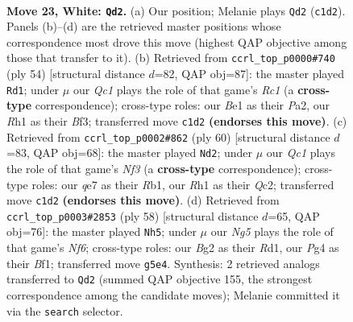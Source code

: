 \documentclass[11pt]{article}
\begin{document}
\clearpage

\begin{figure}[p]\centering
\begin{subfigure}{0.46\textwidth}\centering
\resizebox{\linewidth}{!}{%
\newchessgame
\chessboard[
  setfen={2b1k2r/4qp2/8/2pp2N1/3n2Pp/1p6/1P2PPB1/K1Q1B2R w k - 0 23},
  showmover=false,
  pgfstyle=straightmove, color=movearrow, markmove={c1-d2}
]}
\caption{}
\end{subfigure}\hfill
\begin{subfigure}{0.46\textwidth}\centering
\resizebox{\linewidth}{!}{%
\newchessgame
\chessboard[
  setfen={4r1k1/ppq2pp1/5n1p/2P1Nb2/3Q1P2/5B1P/P5P1/2R3K1 w - - 5 28},
  showmover=false,
  pgfstyle=straightmove, color=movearrow, markmove={c1-d1}
]}
\caption{}
\end{subfigure}
\\[4pt]
\begin{subfigure}{0.46\textwidth}\centering
\resizebox{\linewidth}{!}{%
\newchessgame
\chessboard[
  setfen={1q1r2k1/4bp2/1n4pp/p1n5/P1p5/B4NPP/2Q2PB1/1R4K1 w - - 0 31},
  showmover=false,
  pgfstyle=straightmove, color=movearrow, markmove={f3-d2}
]}
\caption{}
\end{subfigure}\hfill
\begin{subfigure}{0.46\textwidth}\centering
\resizebox{\linewidth}{!}{%
\newchessgame
\chessboard[
  setfen={2r4k/2n2ppp/4pN1q/8/Pp2P1Q1/1n4P1/1B3b1P/3R1B1K w - - 8 30},
  showmover=false,
  pgfstyle=straightmove, color=movearrow, markmove={f6-h5}
]}
\caption{}
\end{subfigure}
\caption{\textbf{Move 23, White: \texttt{Qd2}.} (a) Our position; Melanie plays \texttt{Qd2} (\texttt{c1d2}). Panels (b)--(d) are the retrieved master positions whose correspondence most drove this move (highest QAP objective among those that transfer to it). (b) Retrieved from \texttt{ccrl\_top\_p0000\#740} (ply 54) [structural distance $d$=82, QAP obj=87]: the master played \texttt{Rd1}; under $\mu$ our \emph{Qc1} plays the role of that game's \emph{Rc1} (a \textbf{cross-type} correspondence); cross-type roles: our \emph{B}e1 as their \emph{P}a2, our \emph{R}h1 as their \emph{B}f3; transferred move \texttt{c1d2} \textbf{(endorses this move)}. (c) Retrieved from \texttt{ccrl\_top\_p0002\#862} (ply 60) [structural distance $d$=83, QAP obj=68]: the master played \texttt{Nd2}; under $\mu$ our \emph{Qc1} plays the role of that game's \emph{Nf3} (a \textbf{cross-type} correspondence); cross-type roles: our \emph{q}e7 as their \emph{R}b1, our \emph{R}h1 as their \emph{Q}c2; transferred move \texttt{c1d2} \textbf{(endorses this move)}. (d) Retrieved from \texttt{ccrl\_top\_p0003\#2853} (ply 58) [structural distance $d$=65, QAP obj=76]: the master played \texttt{Nh5}; under $\mu$ our \emph{Ng5} plays the role of that game's \emph{Nf6}; cross-type roles: our \emph{B}g2 as their \emph{R}d1, our \emph{P}g4 as their \emph{B}f1; transferred move \texttt{g5e4}. Synthesis: 2 retrieved analogs transferred to \texttt{Qd2} (summed QAP objective 155, the strongest correspondence among the candidate moves); Melanie committed it via the \texttt{search} selector.}
\label{fig:thought-m44}
\end{figure}
\end{document}
